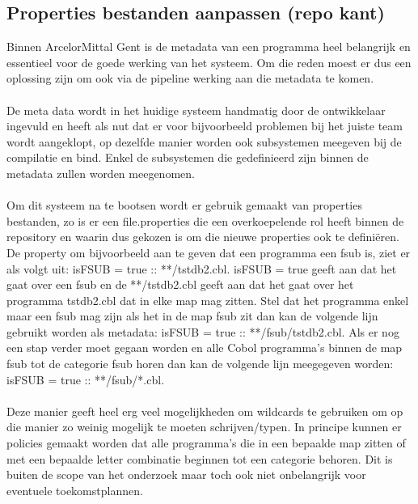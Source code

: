 \subsection{Properties bestanden aanpassen (repo kant)}
Binnen ArcelorMittal Gent is de metadata van een programma heel belangrijk en essentieel voor de goede werking van het systeem. Om die reden moest er dus een oplossing zijn om ook via de pipeline werking aan die metadata te komen. 
\\ \\
De meta data wordt in het huidige systeem handmatig door de ontwikkelaar ingevuld en heeft als nut dat er voor bijvoorbeeld problemen bij het juiste team wordt aangeklopt, op dezelfde manier worden ook subsystemen meegeven bij de compilatie en bind. Enkel de subsystemen die gedefinieerd zijn binnen de metadata zullen worden meegenomen. 
\\ \\
Om dit systeem na te bootsen wordt er gebruik gemaakt van properties bestanden, zo is er een file.properties die een overkoepelende rol heeft binnen de repository en waarin dus gekozen is om die nieuwe properties ook te definiëren. De property om bijvoorbeeld aan te geven dat een programma een fsub is, ziet er als volgt uit:  isFSUB = true :: **/tstdb2.cbl. isFSUB = true geeft aan dat het gaat over een fsub en de **/tstdb2.cbl geeft aan dat het gaat over het programma tstdb2.cbl dat in elke map mag zitten. Stel dat het programma enkel maar een fsub mag zijn als het in de map fsub zit dan kan de volgende lijn gebruikt worden als metadata: isFSUB = true :: **/fsub/tstdb2.cbl. Als er nog een stap verder moet gegaan worden en alle Cobol programma's binnen de map fsub tot de categorie fsub horen dan kan de volgende lijn meegegeven worden: isFSUB = true :: **/fsub/*.cbl. 
\\ \\
Deze manier geeft heel erg veel mogelijkheden om wildcards te gebruiken om op die manier zo weinig mogelijk te moeten schrijven/typen. In principe kunnen er policies gemaakt worden dat alle programma's die in een bepaalde map zitten of met een bepaalde letter combinatie beginnen tot een categorie behoren. Dit is buiten de scope van het onderzoek maar toch ook niet onbelangrijk voor eventuele toekomstplannen. 



